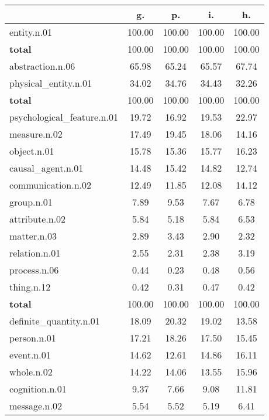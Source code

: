 \begin{table}[h!]
\begin{center}
\begin{tabular}{| l || c | c | c | c |}\hline
 & {\bf g.} & {\bf p.} & {\bf i.} & {\bf h.} \\\hline\hline
entity.n.01 & 100.00  & 100.00  & 100.00  & 100.00 \\\hline\hline
{{\bf total}} & 100.00  & 100.00  & 100.00  & 100.00 \\\hline\hline\hline
abstraction.n.06 & 65.98  & 65.24  & 65.57  & 67.74 \\\hline
physical\_entity.n.01 & 34.02  & 34.76  & 34.43  & 32.26 \\\hline\hline
{{\bf total}} & 100.00  & 100.00  & 100.00  & 100.00 \\\hline\hline\hline
psychological\_feature.n.01 & 19.72  & 16.92  & 19.53  & 22.97 \\\hline
measure.n.02 & 17.49  & 19.45  & 18.06  & 14.16 \\\hline
object.n.01 & 15.78  & 15.36  & 15.77  & 16.23 \\\hline
causal\_agent.n.01 & 14.48  & 15.42  & 14.82  & 12.74 \\\hline
communication.n.02 & 12.49  & 11.85  & 12.08  & 14.12 \\\hline
group.n.01 & 7.89  & 9.53  & 7.67  & 6.78 \\\hline
attribute.n.02 & 5.84  & 5.18  & 5.84  & 6.53 \\\hline
matter.n.03 & 2.89  & 3.43  & 2.90  & 2.32 \\\hline
relation.n.01 & 2.55  & 2.31  & 2.38  & 3.19 \\\hline
process.n.06 & 0.44  & 0.23  & 0.48  & 0.56 \\\hline
thing.n.12 & 0.42  & 0.31  & 0.47  & 0.42 \\\hline\hline
{{\bf total}} & 100.00  & 100.00  & 100.00  & 100.00 \\\hline\hline\hline
definite\_quantity.n.01 & 18.09  & 20.32  & 19.02  & 13.58 \\\hline
person.n.01 & 17.21  & 18.26  & 17.50  & 15.45 \\\hline
event.n.01 & 14.62  & 12.61  & 14.86  & 16.11 \\\hline
whole.n.02 & 14.22  & 14.06  & 13.55  & 15.96 \\\hline
cognition.n.01 & 9.37  & 7.66  & 9.08  & 11.81 \\\hline
message.n.02 & 5.54  & 5.52  & 5.19  & 6.41 \\\hline

\end{tabular}
\end{center}
\end{table}
